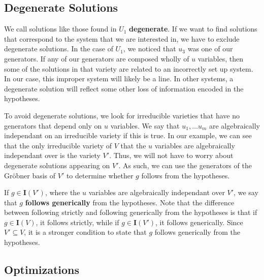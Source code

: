 \documentclass[12pt]{article}
\theoremstyle{plain}
\theoremstyle{definition}
\theoremstyle{remark}
\newcommand{\gro}{Gr\"obner }
\begin{document}
\subsection{Degenerate Solutions}

We call solutions like those found in $U_1$ \textbf{degenerate}. If we want to find solutions that correspond to the system that we are interested in, we have to exclude degenerate solutions.
In the case of $U_1$, we noticed that $u_3$ was one of our generators. 
If any of our generators are composed wholly of $u$ variables, then some of the solutions in that variety are related to an incorrectly set up system.
In our case, this improper system will likely be a line.
In other systems, a degenerate solution will reflect some other loss of information encoded in the hypotheses.

To avoid degenerate solutions, we look for irreducible varieties that have no generators that depend only on $u$ variables. 
We say that $u_1,\dots u_m$ are algebraically independant on an irreducible variety if this is true.
In our example, we can see that the only irreducible variety of $V$ that the $u$ variables are algebraically independant over is the variety $V'$.
Thus, we will not have to worry about degenerate solutions appearing on $V'$. 
As such, we can use the generators of the \gro basis of $V'$ to determine whether $g$ follows from the hypotheses.

If $g \in \textbf{I}(V')$, where the $u$ variables are algebraically independant over $V'$, we say that $g$ \textbf{follows generically} from the hypotheses.
Note that the difference between following strictly and following generically from the hypotheses is that if $g \in \textbf{I}(V)$, it follows strictly, 
while if $g \in \textbf{I}(V')$, it follows generically.
Since $V' \subseteq V$, it is a stronger condition to state that $g$ follows generically from the hypotheses.


\subsection{Optimizations}
\end{document}
